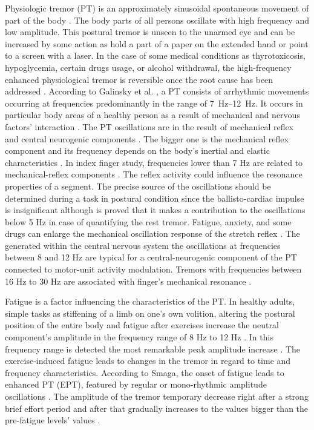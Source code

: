 \documentclass[conference, a4paper]{IEEEtran}
\begin{document}
Physiologic tremor (PT) is an approximately sinusoidal spontaneous movement of  part of the body \cite{RN21}. The body parts of all persons oscillate with high frequency and low amplitude. This postural tremor is unseen to the unarmed eye and can be increased by some action as hold a part of a paper on the extended hand or point to a screen with a laser. In the case of some medical conditions as thyrotoxicosis, hypoglycemia,  certain drugs usage, or alcohol withdrawal, the high-frequency enhanced physiological  tremor is reversible once the root cause has been addressed \cite{RN7}. According to Galinsky et al. \cite{RN4}, a PT consists of arrhythmic movements occurring at frequencies predominantly in the range of \SIrange{7}{12}{\Hz}. It occurs in particular body areas of a healthy person as a result of mechanical and nervous factors' interaction \cite{RN22}. The PT oscillations are in the result of mechanical reflex and central neurogenic components \cite{RN23,RN26}. The bigger one is the mechanical reflex component and its frequency depends on the body's inertial and elastic characteristics \cite{RN26}. In index finger study,  frequencies lower than 7 Hz are related to mechanical-reflex components \cite{RN1}. The reflex activity could influence the resonance properties of a segment. The precise source of the oscillations should be determined during a task in postural condition since the ballisto-cardiac impulse is insignificant although is proved that it makes a contribution to the oscillations below  5 Hz in case of quantifying the rest tremor. Fatigue, anxiety, and some drugs can enlarge the mechanical oscillation response of the stretch reflex \cite{RN1}. The generated within the central nervous system the oscillations at frequencies between 8 and 12 Hz are typical for a central-neurogenic component of the PT connected to motor-unit activity modulation. Tremors with frequencies between 16 Hz to 30 Hz are associated with finger's mechanical resonance \cite{RN1, RN2, RN23, RN26}.

Fatigue is a factor influencing the characteristics of the PT. In healthy adults, simple tasks as stiffening of a limb on one's own volition, altering the postural position of the entire body and fatigue after exercises increase the neutral component's amplitude in the frequency range of 8 Hz to 12 Hz \cite{RN5}.  In this frequency range is detected the most remarkable peak amplitude increase \cite{RN6}. The exercise-induced fatigue leads to changes in the tremor in regard to time and frequency characteristics. According to Smaga, the onset of fatigue leads to enhanced PT (EPT), featured by regular or mono-rhythmic amplitude oscillations \cite{RN4,RN7}. The amplitude of the tremor temporary decrease right after a strong brief effort period and after that gradually increases to the values bigger than the pre-fatigue levels' values \cite{RN24,RN4}.
\end{document}
